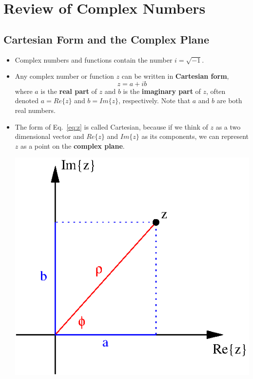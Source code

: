 \documentclass[12pt]{article}
\begin{document}
\section*{Review of Complex Numbers}

\subsection*{Cartesian Form and the Complex Plane}
\begin{itemize}
\item Complex numbers and functions contain the number
  $i = \sqrt{-1}$.

\item Any complex number or function $z$ can be written in
  \textbf{Cartesian form},
  \begin{equation}
    \label{eq:z}
    z = a + i b
  \end{equation}
  where $a$ is the \textbf{real part} of $z$ and $b$ is the
  \textbf{imaginary part} of $z$, often denoted $a = Re\{z\}$ and
  $b = Im\{z\}$, respectively. Note that $a$ and $b$ are both real numbers.

\item The form of Eq.~\ref{eq:z} is called Cartesian, because if we
  think of $z$ as a two dimensional vector and $Re\{z\}$ and $Im\{z\}$
  as its components, we can represent $z$ as a point on the
  \textbf{complex plane}.
  \begin{center}
    \includegraphics{complex.eps}
  \end{center}

\end{itemize}
\end{document}
